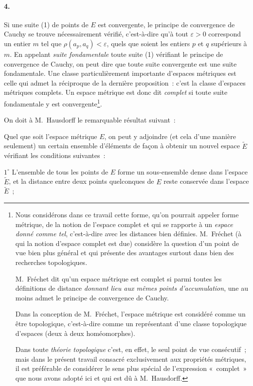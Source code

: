 \documentclass[a4paper,12pt]{amsart}
\newcommand{\srcpage}[1]{} %
\begin{document}
\paragraph{4.}
Si une suite (1) de points de $E$ est convergente, le principe de convergence de Cauchy se trouve nécessairement vérifié, c'est-à-dire qu'à tout $\varepsilon>0$ correspond un entier $m$ tel que $\rho(a_p,a_q)<\varepsilon$, quels que soient les entiers $p$ et $q$ supérieurs à $m$. En appelant \textit{suite fondamentale} toute suite (1) vérifiant le principe de convergence de Cauchy, on peut dire que toute suite convergente est une suite fondamentale. Une classe particulièrement importante d'espaces métriques est celle qui admet la réciproque de la dernière proposition~: c'est la classe d'espaces métriques complets. Un espace métrique est donc dit \textit{complet} si toute suite fondamentale y est convergente\footnote{Nous considérons dans ce travail cette forme, qu'on pourrait appeler forme métrique, de la notion de l'espace complet et qui se rapporte à un \textit{espace donné comme tel}, c'est-à-dire avec les distances bien définies. M.~Fréchet (à qui la notion d'espace complet est due) considère la question d'un point de vue bien plus général et qui présente des avantages surtout dans bien des recherches topologiques.

M.~Fréchet dit qu'un espace métrique est complet si parmi toutes les définitions de distance \textit{donnant lieu aux mêmes points d'accumulation}, une au moins admet le principe de convergence de Cauchy.

Dans la conception de M.~Fréchet, l'espace métrique est considéré comme un être topologique, c'est-à-dire comme un représentant d'une classe topologique d'espaces (deux à deux homéomorphes).

Dans toute \textit{théorie topologique} c'est, en effet, le seul point de vue consécutif~; mais dans le présent travail consacré exclusivement aux propriétés métriques, il est préférable de considérer le sens plus spécial de l'expression «~complet~» que nous avons adopté ici et qui est dû à M.~Hausdorff.}.

On doit à M.~Hausdorff le remarquable résultat suivant~:

Quel que soit l'espace métrique $E$, on peut y adjoindre (et cela d'une manière seulement) un certain ensemble d'éléments de façon à obtenir un nouvel espace $\widetilde{E}$ vérifiant les conditions suivantes~:

$1^\circ$ L'ensemble de tous les points de $E$ forme un sous-ensemble dense dans l'espace $\widetilde{E}$, et la distance entre deux points quelconques de $E$ reste conservée dans l'espace $\widetilde{E}$~;
\srcpage{47}
\end{document}
